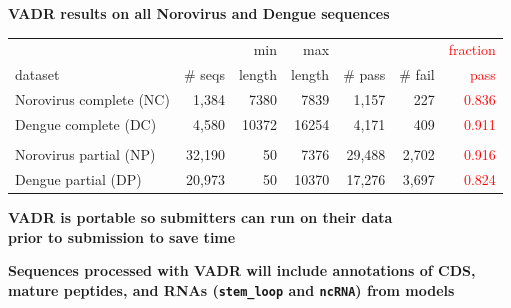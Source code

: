 \documentclass[landscape]{slides}
\begin{document}
\begin{slide}
\begin{center}
\textbf{VADR results on all Norovirus and Dengue sequences}


\scriptsize
\begin{tabular}{l|r|r|r|r|r|r}
                        &         & min    & max      &         &         & \textcolor{red}{fraction} \\
 dataset                & \# seqs & length & length   & \# pass & \# fail & \textcolor{red}{pass} \\ \hline
Norovirus complete (NC) & 1,384    & 7380  & 7839     & 1,157    & 227     & \textcolor{red}{0.836} \\
Dengue complete (DC)    & 4,580    & 10372 & 16254    & 4,171    & 409     & \textcolor{red}{0.911} \\
& & & & & \\
Norovirus partial (NP)  & 32,190   & 50    & 7376     & 29,488   & 2,702    & \textcolor{red}{0.916} \\
Dengue partial  (DP)    & 20,973   & 50    & 10370    & 17,276   & 3,697    & \textcolor{red}{0.824} \\
\end{tabular}

\medskip
\normalsize
\textbf{VADR is portable so submitters can run on their data \\ prior to
  submission to save time}

\normalsize
\textbf{Sequences processed with VADR will include annotations of CDS, mature peptides, and RNAs
  (\texttt{stem\_loop} and \texttt{ncRNA}) from models}

\end{center}
\vfill
\end{slide}
%
%
\end{document}
